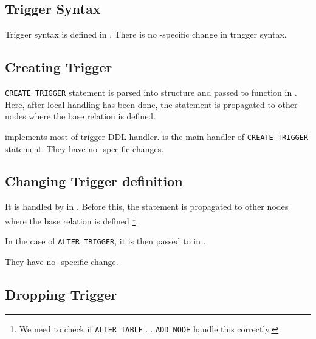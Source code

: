 

\subsection{Trigger Syntax}

  Trigger syntax is defined in .
  There is no \XC-specific change in trngger syntax.



\subsection{Creating Trigger}

  \texttt{CREATE TRIGGER} statement is parsed into  structure and passed to
   function in .
  Here, after local handling has been done, the statement is propagated to other nodes where the base
  relation is defined.
  
   implements most of trigger DDL handler.
   is the main handler of {\tt C\tt REATE TRIGGER} statement.
  They have no \XC-specific changes.



\subsection{Changing Trigger definition}

  It is handled by  in .
  Before this, the statement is propagated to other nodes where the base relation is defined
  \footnote{
	  We need to check if \texttt{ALTER TABLE} ... \texttt{ADD NODE} handle this correctly.
  }.
  
  In the case of \texttt{ALTER TRIGGER}, it is then passed to  in .
  
  They have no \XC-specific change.



\subsection{Dropping Trigger}

